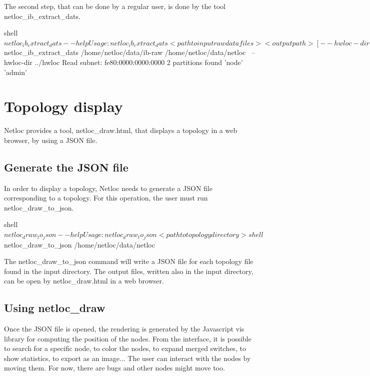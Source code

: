 The second step, that can be done by a regular user, is done by the tool {\ttfamily netloc\+\_\+ib\+\_\+extract\+\_\+dats}.

\begin{DoxyVerb}shell$ netloc_ib_extract_dats --help
Usage: netloc_ib_extract_dats <path to input raw data files> <output path> [--hwloc-dir
<hwloc xml path>]
        hwloc-dir can be an absolute path or a relative path from output path

shell$ netloc_ib_extract_dats /home/netloc/data/ib-raw /home/netloc/data/netloc \
  --hwloc-dir ../hwloc
Read subnet: fe80:0000:0000:0000
2 partitions found
        'node'
        'admin'
\end{DoxyVerb}


 \hypertarget{a00396_netloc_draw}{}\section{Topology display}\label{a00396_netloc_draw}
Netloc provides a tool, {\ttfamily netloc\+\_\+draw.\+html}, that displays a topology in a web browser, by using a J\+S\+ON file.\hypertarget{a00396_netloc_draw_setup}{}\subsection{Generate the J\+S\+O\+N file}\label{a00396_netloc_draw_setup}
In order to display a topology, Netloc needs to generate a J\+S\+ON file corresponding to a topology. For this operation, the user must run {\ttfamily netloc\+\_\+draw\+\_\+to\+\_\+json}.

\begin{DoxyVerb}shell$ netloc_draw_to_json --help
Usage: netloc_draw_to_json <path to topology directory>

shell$ netloc_draw_to_json /home/netloc/data/netloc
\end{DoxyVerb}


The {\ttfamily netloc\+\_\+draw\+\_\+to\+\_\+json} command will write a J\+S\+ON file for each topology file found in the input directory. The output files, written also in the input directory, can be open by {\ttfamily netloc\+\_\+draw.\+html} in a web browser.\hypertarget{a00396_netloc_draw_tool}{}\subsection{Using netloc\+\_\+draw}\label{a00396_netloc_draw_tool}
Once the J\+S\+ON file is opened, the rendering is generated by the Javascript vis library for computing the position of the nodes. From the interface, it is possible to search for a specific node, to color the nodes, to expand merged switches, to show statistics, to export as an image... The user can interact with the nodes by moving them. For now, there are bugs and other nodes might move too.


